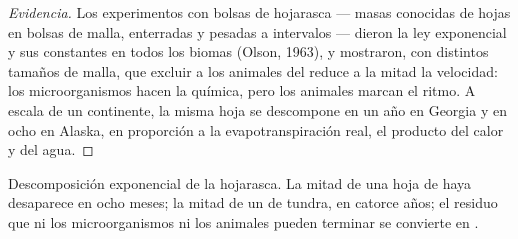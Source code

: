 \begin{proof}[Evidencia]
Los experimentos con bolsas de hojarasca --- masas conocidas de hojas en
bolsas de malla, enterradas y pesadas a intervalos --- dieron la ley
exponencial y sus constantes en todos los biomas (Olson, 1963), y
mostraron, con distintos tamaños de malla, que excluir a los animales del
 reduce a la mitad la velocidad: los microorganismos hacen la química,
pero los animales marcan el ritmo. A escala de un continente, la misma
hoja se descompone en un año en Georgia y en ocho en Alaska, en proporción
a la evapotranspiración real, el producto del calor y del agua.
\end{proof}

\begin{omfigure}

{\small Descomposición exponencial de la hojarasca. La mitad de una hoja de
haya desaparece en ocho meses; la mitad de un  de tundra, en catorce
años; el residuo que ni los microorganismos ni los animales pueden
terminar se convierte en .}
\end{omfigure}

